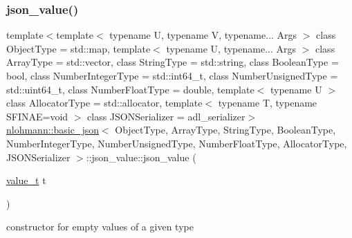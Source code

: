 \subsubsection{\texorpdfstring{json\+\_\+value()}{json\_value()}\hspace{0.1cm}{\footnotesize\ttfamily [6/12]}}
{\footnotesize\ttfamily template$<$template$<$ typename U, typename V, typename... Args $>$ class Object\+Type = std\+::map, template$<$ typename U, typename... Args $>$ class Array\+Type = std\+::vector, class String\+Type  = std\+::string, class Boolean\+Type  = bool, class Number\+Integer\+Type  = std\+::int64\+\_\+t, class Number\+Unsigned\+Type  = std\+::uint64\+\_\+t, class Number\+Float\+Type  = double, template$<$ typename U $>$ class Allocator\+Type = std\+::allocator, template$<$ typename T, typename S\+F\+I\+N\+A\+E=void $>$ class J\+S\+O\+N\+Serializer = adl\+\_\+serializer$>$ \\
\hyperlink{classnlohmann_1_1basic__json}{nlohmann\+::basic\+\_\+json}$<$ Object\+Type, Array\+Type, String\+Type, Boolean\+Type, Number\+Integer\+Type, Number\+Unsigned\+Type, Number\+Float\+Type, Allocator\+Type, J\+S\+O\+N\+Serializer $>$\+::json\+\_\+value\+::json\+\_\+value (\begin{DoxyParamCaption}\item[{\hyperlink{namespacenlohmann_1_1detail_a1ed8fc6239da25abcaf681d30ace4985}{value\+\_\+t}}]{t }\end{DoxyParamCaption})\hspace{0.3cm}{\ttfamily [inline]}}



constructor for empty values of a given type 

\mbox{\label{unionnlohmann_1_1basic__json_1_1json__value_a8f75abc358ee45b9bbdc601c974d6c91}} 
